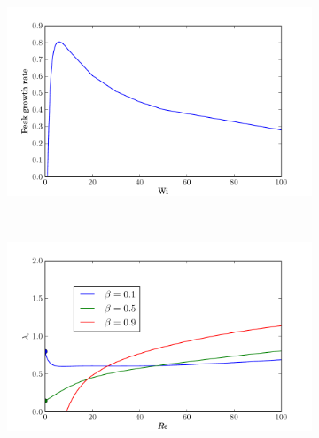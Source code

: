 \documentclass{jfm}
\begin{document}
\begin{figure}
    \centering
    \begin{subfigure}[b]{0.48\textwidth}
	\centering
	\includegraphics[width=\textwidth]{KH_purely_elastic}
    \caption{}
    \label{fig:KH_purely_elastic}
\end{subfigure}
~
\begin{subfigure}[b]{0.48\textwidth}
    \centering
    \includegraphics[width=\textwidth]{KH_low_Wi_vary_Re}
    \caption{}
    \label{fig:KH_reduce_Re}
\end{subfigure}


\end{figure}
\end{document}

